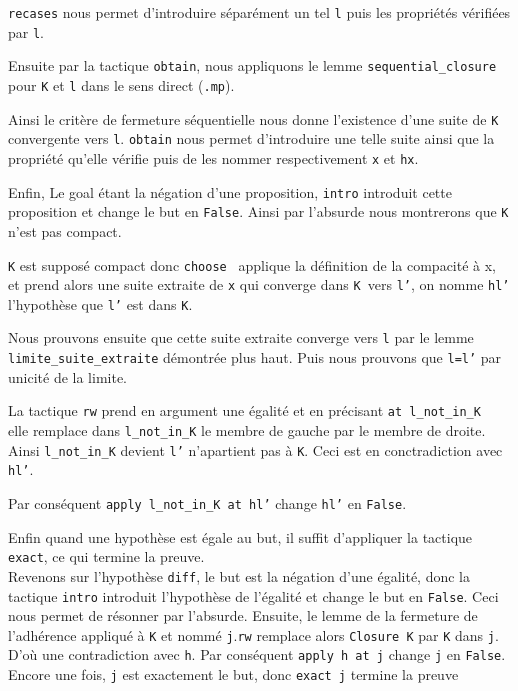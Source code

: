 \documentclass[a4paper, 12pt]{article}
\newcommand{\lean}[1]{\texttt{#1}}
\begin{document}
\lean{recases} nous permet d'introduire séparément un tel \lean{l} puis les propriétés vérifiées par \lean{l}.

Ensuite par la tactique \lean{obtain}, nous appliquons le lemme \lean{sequential_closure} pour \lean{K} et \lean{l} dans le sens direct (\lean{.mp}).

Ainsi le critère de fermeture séquentielle nous donne l'existence d'une suite de \lean{K} convergente vers \lean{l}. \lean{obtain} nous permet d'introduire une telle suite ainsi que la propriété qu'elle vérifie puis de les nommer respectivement \lean{x} et \lean{hx}.

Enfin, Le goal étant la négation d'une proposition, \lean{intro} introduit cette proposition et change le but en \lean{False}. Ainsi par l'absurde nous montrerons que \lean{K} n'est pas compact. 

\lean{K} est supposé compact donc \lean{choose } applique la définition de la compacité à x, et prend alors une suite extraite de \lean{x} qui converge dans \lean{K }vers \lean{l'}, on nomme \lean{hl'} l'hypothèse que \lean{l'} est dans \lean{K}.

Nous prouvons ensuite que cette suite extraite converge vers \lean{l} par le lemme \lean{limite_suite_extraite} démontrée plus haut. Puis nous prouvons que \lean{l=l'} par unicité de la limite. 

La tactique \lean{rw} prend en argument une égalité et en précisant \lean{at l_not_in_K } elle remplace dans \lean{l_not_in_K} le membre de gauche par le membre de droite. Ainsi \lean{l_not_in_K} devient \lean{l'} n'apartient pas à \lean{K}. Ceci est en conctradiction avec \lean{hl'}. 

Par conséquent \lean{apply l_not_in_K at hl'} change \lean{hl'} en \lean{False}.

Enfin quand une hypothèse est égale au but, il suffit d'appliquer la tactique \lean{exact}, ce qui termine la preuve.\\


Revenons sur l'hypothèse \lean{diff}, le but est la négation d'une égalité, donc la tactique \lean{intro} introduit l'hypothèse de l'égalité et change le but en \lean{False}. Ceci nous permet de résonner par l'absurde. Ensuite, le lemme de la fermeture de l'adhérence appliqué à \lean{K} et nommé \lean{j}.\lean{rw} remplace alors \lean{Closure K} par \lean{K} dans \lean{j}. D'où une contradiction avec \lean{h}. Par conséquent \lean{apply h at j} change \lean{j} en \lean{False}. Encore une fois, \lean{j} est exactement le but, donc \lean{exact j} termine la preuve
\end{document}
